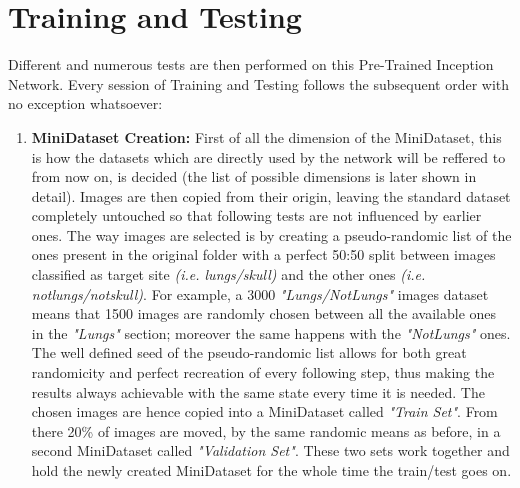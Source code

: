 \documentclass[../main.tex]{subfiles}
\begin{document}
\section{Training and Testing}
Different and numerous tests are then performed on this Pre-Trained Inception Network. Every session of Training and Testing follows the subsequent order with no exception whatsoever:
\begin{enumerate}
	\item \textbf{MiniDataset Creation:} First of all the dimension of the MiniDataset, this is how the datasets which are directly used by the network will be reffered to from now on, is decided (the list of possible dimensions is later shown in detail). Images are then copied from their origin, leaving the standard dataset completely untouched so that following tests are not influenced by earlier ones. The way images are selected is by creating a pseudo-randomic list of the ones present in the original folder with a perfect 50:50 split between images classified as target site \textit{(i.e. lungs/skull)} and the other ones \textit{(i.e. notlungs/notskull)}. For example, a 3000 \textit{"Lungs/NotLungs"} images dataset means that 1500 images are randomly chosen between all the available ones in the \textit{"Lungs"} section; moreover the same happens with the \textit{"NotLungs"} ones. The well defined seed of the pseudo-randomic list allows for both great randomicity and perfect recreation of every following step, thus making the results always achievable with the same state every time it is needed. The chosen images are hence copied into a MiniDataset called \textit{"Train Set"}. From there 20\% of images are moved, by the same randomic means as before, in a second MiniDataset called \textit{"Validation Set"}. These two sets work together and hold the newly created MiniDataset for the whole time the train/test goes on.


\end{enumerate}
\end{document}
